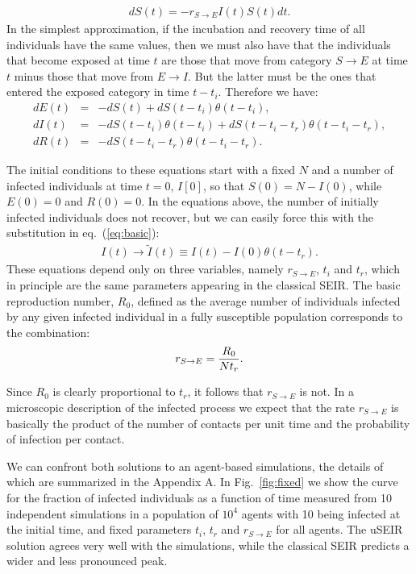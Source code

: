 \documentclass[a4paper,oneside,11pt]{article}
\begin{document}
\begin{eqnarray}
d S(t) = - r_{S\rightarrow E} I(t) S(t) dt.
\label{eq:basic}
\end{eqnarray}
In the simplest approximation, if the incubation and recovery time of all individuals have the same values, then we must also have that the individuals that become exposed at time 
$t$ are those that move from category $S\rightarrow E$ at time $t$ minus those that move from $E\rightarrow I$. But the latter must be the ones that entered the exposed category in time $t-t_i$. Therefore we have:
\begin{eqnarray}
d E(t) &=& -d S(t) + d S(t-t_i) \theta(t-t_i) ,\nonumber\\
d I(t) &=& -d S(t-t_i) \theta(t-t_i)+ d S(t-t_i-t_r) \theta(t-t_i-t_r),\nonumber\\
d R(t) &=& - d S(t - t_i - t_r) \theta(t-t_i-t_r).\nonumber
\label{eqs:cor}
\end{eqnarray}

The initial conditions to these equations start with a fixed $N$ and a number of infected individuals at time $t=0$, $I[0]$, so that $S(0) = N-I(0)$, while $E(0)=0$ and $R(0)=0$.  
In the  equations above, the number of initially infected individuals does not recover, but we can easily force this with the substitution in eq.~(\ref{eq:basic}):
\begin{eqnarray}
I(t) \rightarrow \tilde{I}(t) \equiv I(t) - I(0) \theta(t-t_r).
\end{eqnarray}
These equations depend only on three variables, namely $r_{S\rightarrow E}$, $t_i$ and $t_r$, which in principle are the same parameters appearing in the classical SEIR.
The basic reproduction number, $R_0$, defined as the average number of individuals infected by any given infected individual in a fully susceptible population corresponds to the combination:
\begin{eqnarray}
r_{S\rightarrow E} = {R_0\over N t_r}. 
\end{eqnarray}

Since $R_0$ is clearly proportional to $t_r$, it follows that $r_{S\rightarrow E}$ is not. In a microscopic description of the infected process we expect that the rate $r_{S\rightarrow E}$ is basically the product of the number of contacts per unit time and the probability of infection per contact. 


  
  
  We can confront both solutions to an agent-based simulations, the details of which are summarized in the Appendix A. 
In Fig.~\ref{fig:fixed} we show the curve for the fraction of infected individuals as a function of time measured from 10 independent simulations in a population of $10^4$ agents with 10 being infected at the initial time, and fixed parameters $t_i$, $t_r$ and $r_{S\rightarrow E}$ for all agents. 
The uSEIR solution agrees very well with the simulations, while the classical SEIR predicts a wider and less pronounced peak. 
\end{document}
